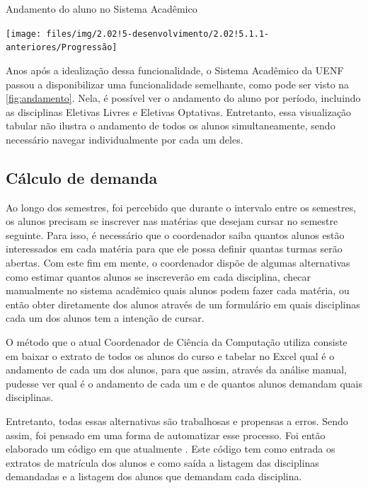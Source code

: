 \begin{MyCenteredFigure}
  \caption{Andamento do aluno no Sistema Acadêmico}
  \label{fig:andamento}
  \texttt{[image: files/img/2.02!5-desenvolvimento/2.02!5.1.1-anteriores/Progressão]}
\end{MyCenteredFigure}

Anos após a idealização dessa funcionalidade, o Sistema Acadêmico da UENF passou a disponibilizar uma funcionalidade semelhante, como pode ser visto na \autoref{fig:andamento}. Nela, é possível ver o andamento do aluno por período, incluindo as disciplinas Eletivas Livres e Eletivas Optativas. Entretanto, essa visualização tabular não ilustra o andamento de todos os alunos simultaneamente, sendo necessário navegar individualmente por cada um deles.

\subsection{Cálculo de demanda} \label{subsec:demanda} %

Ao longo dos semestres, foi percebido que durante o intervalo entre os semestres, os alunos precisam se inscrever nas matérias que desejam cursar no semestre seguinte. Para isso, é necessário que o coordenador saiba quantos alunos estão interessados em cada matéria para que ele possa definir quantas turmas serão abertas. Com este fim em mente, o coordenador dispõe de algumas alternativas como estimar quantos alunos se inscreverão em cada disciplina, checar manualmente no sistema acadêmico quais alunos podem fazer cada matéria, ou então obter diretamente dos alunos através de um formulário em quais disciplinas cada um dos alunos tem a intenção de cursar.

O método que o atual Coordenador de Ciência da Computação utiliza consiste em baixar o extrato de todos os alunos do curso e tabelar no Excel qual é o andamento de cada um dos alunos, para que assim, através da análise manual, pudesse ver qual é o andamento de cada um e de quantos alunos demandam quais disciplinas.

Entretanto, todas essas alternativas são trabalhosas e propensas a erros. Sendo assim, foi pensado em uma forma de automatizar esse processo. Foi então elaborado um código em  que atualmente . Este código tem como entrada os extratos de matrícula dos alunos e como saída a listagem das disciplinas demandadas e a listagem dos alunos que demandam cada disciplina.


